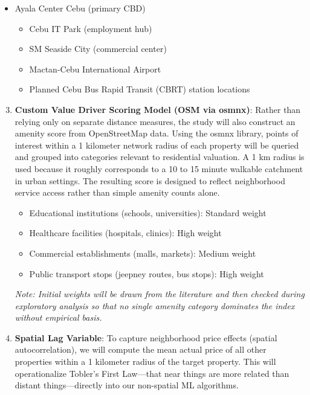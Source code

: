 \begin{itemize}
\item Ayala Center Cebu (primary CBD)
\begin{itemize}
\item Cebu IT Park (employment hub)
\item SM Seaside City (commercial center)
\item Mactan-Cebu International Airport
\item Planned Cebu Bus Rapid Transit (CBRT) station locations
\end{itemize}
\end{itemize}

\begin{enumerate}
\setcounter{enumi}{2}
\item \textbf{Custom Value Driver Scoring Model (OSM via osmnx)}: Rather than relying only on separate distance measures, the study will also construct an amenity score from OpenStreetMap data. Using the osmnx library, points of interest within a 1 kilometer network radius of each property will be queried and grouped into categories relevant to residential valuation. A 1 km radius is used because it roughly corresponds to a 10 to 15 minute walkable catchment in urban settings. The resulting score is designed to reflect neighborhood service access rather than simple amenity counts alone.
\begin{itemize}
\item Educational institutions (schools, universities): Standard weight
\item Healthcare facilities (hospitals, clinics): High weight
\item Commercial establishments (malls, markets): Medium weight
\item Public transport stops (jeepney routes, bus stops): High weight
\end{itemize}
\emph{Note: Initial weights will be drawn from the literature and then checked during exploratory analysis so that no single amenity category dominates the index without empirical basis.}
\item \textbf{Spatial Lag Variable}: To capture neighborhood price effects (spatial autocorrelation), we will compute the mean actual price of all other properties within a 1 kilometer radius of the target property. This will operationalize Tobler's First Law---that near things are more related than distant things---directly into our non-spatial ML algorithms.
\end{enumerate}

